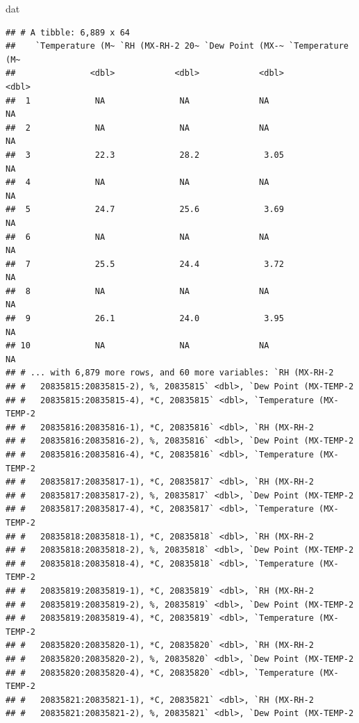 \documentclass[]{article}
\newenvironment{Shaded}{\begin{snugshade}}{\end{snugshade}}
\newcommand{\NormalTok}[1]{#1}
\begin{document}
\begin{Shaded}
\begin{Highlighting}[]
\NormalTok{dat}
\end{Highlighting}
\end{Shaded}

\begin{verbatim}
## # A tibble: 6,889 x 64
##    `Temperature (M~ `RH (MX-RH-2 20~ `Dew Point (MX-~ `Temperature (M~
##               <dbl>            <dbl>            <dbl>            <dbl>
##  1             NA               NA              NA                  NA
##  2             NA               NA              NA                  NA
##  3             22.3             28.2             3.05               NA
##  4             NA               NA              NA                  NA
##  5             24.7             25.6             3.69               NA
##  6             NA               NA              NA                  NA
##  7             25.5             24.4             3.72               NA
##  8             NA               NA              NA                  NA
##  9             26.1             24.0             3.95               NA
## 10             NA               NA              NA                  NA
## # ... with 6,879 more rows, and 60 more variables: `RH (MX-RH-2
## #   20835815:20835815-2), %, 20835815` <dbl>, `Dew Point (MX-TEMP-2
## #   20835815:20835815-4), *C, 20835815` <dbl>, `Temperature (MX-TEMP-2
## #   20835816:20835816-1), *C, 20835816` <dbl>, `RH (MX-RH-2
## #   20835816:20835816-2), %, 20835816` <dbl>, `Dew Point (MX-TEMP-2
## #   20835816:20835816-4), *C, 20835816` <dbl>, `Temperature (MX-TEMP-2
## #   20835817:20835817-1), *C, 20835817` <dbl>, `RH (MX-RH-2
## #   20835817:20835817-2), %, 20835817` <dbl>, `Dew Point (MX-TEMP-2
## #   20835817:20835817-4), *C, 20835817` <dbl>, `Temperature (MX-TEMP-2
## #   20835818:20835818-1), *C, 20835818` <dbl>, `RH (MX-RH-2
## #   20835818:20835818-2), %, 20835818` <dbl>, `Dew Point (MX-TEMP-2
## #   20835818:20835818-4), *C, 20835818` <dbl>, `Temperature (MX-TEMP-2
## #   20835819:20835819-1), *C, 20835819` <dbl>, `RH (MX-RH-2
## #   20835819:20835819-2), %, 20835819` <dbl>, `Dew Point (MX-TEMP-2
## #   20835819:20835819-4), *C, 20835819` <dbl>, `Temperature (MX-TEMP-2
## #   20835820:20835820-1), *C, 20835820` <dbl>, `RH (MX-RH-2
## #   20835820:20835820-2), %, 20835820` <dbl>, `Dew Point (MX-TEMP-2
## #   20835820:20835820-4), *C, 20835820` <dbl>, `Temperature (MX-TEMP-2
## #   20835821:20835821-1), *C, 20835821` <dbl>, `RH (MX-RH-2
## #   20835821:20835821-2), %, 20835821` <dbl>, `Dew Point (MX-TEMP-2

\end{verbatim}
\end{document}
